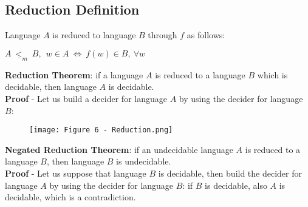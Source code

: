 \documentclass{article}
\begin{document}
\subsection{Reduction Definition}
Language $A$ is reduced to language $B$ through $f$ as follows:
\begin{center}
    $A \ \underline<_m \ B, \ \ w \in A \ \Longleftrightarrow \ f(w) \in B, \ \forall w$
\end{center}
\vspace{0.2cm}
\textbf{Reduction Theorem}: if a language $A$ is reduced to a language $B$ which is decidable, then language $A$ is decidable.
\vspace{0.1cm} \\
\textbf{Proof} - Let us build a decider for language $A$ by using the decider for language $B$:
\begin{figure}[H]
    \centering
    \texttt{[image: Figure 6 - Reduction.png]}
\end{figure}
\noindent
\textbf{Negated Reduction Theorem}: if an undecidable language $A$ is reduced to a language $B$, then language $B$ is undecidable.
\vspace{0.1cm} \\
\textbf{Proof} - Let us suppose that language $B$ is decidable, then build the decider for language $A$ by using the decider for language $B$: if $B$ is decidable, also $A$ is decidable, which is a contradiction.
\end{document}

